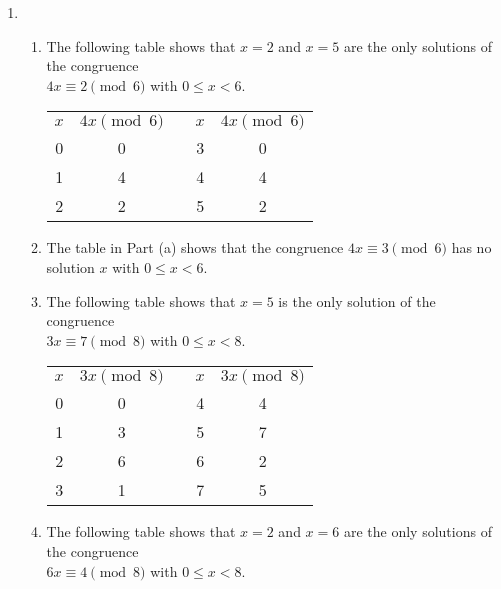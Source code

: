 \begin{enumerate} \setcounter{enumi}{\theoldenumi}
\item \begin{enumerate}
  \item The following table shows that $x = 2$ and  $x = 5$ are the only solutions of the congruence \\ $4x \equiv 2 \pmod 6$ with $0 \leq x < 6$.

\begin{center}
\begin{tabular}[t]{ c | c  c  c | c } 
$x$  &  $4x \pmod 6$ & & $x$  &  $4x \pmod 6$ \\ \cline{1-2} \cline{4-5}
0  &  0  &  &  3  &  0 \\ \cline{1-2} \cline{4-5}
1  &  4  &  &  4  &  4 \\ \cline{1-2} \cline{4-5}
2  &  2  &  &  5  &  2 \\ \cline{1-2} \cline{4-5}
\end{tabular}
\end{center}


  \item The table in Part (a) shows that the congruence $4x \equiv 3 \pmod 6$ has no solution $x$ with $0 \leq x < 6$.



\item The following table shows that $x = 5$  is the only solution of the congruence \\ $3x \equiv 7 \pmod 8$ with $0 \leq x < 8$.

\begin{center}
\begin{tabular}[t]{ c | c  c  c | c } 
$x$  &  $3x \pmod 8$ & & $x$  &  $3x \pmod 8$ \\ \cline{1-2} \cline{4-5}
0  &  0  &  &  4  &  4 \\ \cline{1-2} \cline{4-5}
1  &  3  &  &  5  &  7 \\ \cline{1-2} \cline{4-5}
2  &  6  &  &  6  &  2 \\ \cline{1-2} \cline{4-5}
3  &  1  &  &  7  &  5 \\ \cline{1-2} \cline{4-5}
\end{tabular}
\end{center}


\item The following table shows that $x = 2$ and  $x = 6$ are the only solutions of the congruence \\ $6x \equiv 4 \pmod 8$ with $0 \leq x < 8$.


\end{enumerate}
\end{enumerate}
